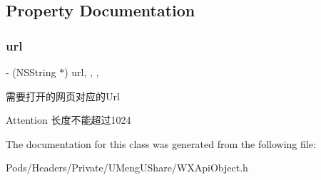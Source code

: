 \subsection{Property Documentation}
\mbox{\label{interface_open_webview_req_a2ea85dd46e252183bd14d075d41aa1b0}} 
\subsubsection{\texorpdfstring{url}{url}}
{\footnotesize\ttfamily -\/ (N\+S\+String $\ast$) url\hspace{0.3cm}{\ttfamily [read]}, {\ttfamily [write]}, {\ttfamily [nonatomic]}, {\ttfamily [retain]}}

需要打开的网页对应的\+Url \begin{DoxyAttention}{Attention}
长度不能超过1024 
\end{DoxyAttention}


The documentation for this class was generated from the following file\+:\begin{DoxyCompactItemize}
\item 
Pods/\+Headers/\+Private/\+U\+Meng\+U\+Share/W\+X\+Api\+Object.\+h\end{DoxyCompactItemize}
